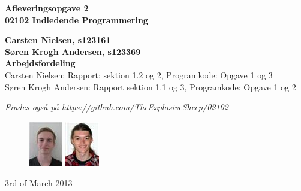 \thispagestyle{empty} %
\hspace{6cm} \vspace{3cm}
\begin{center}
\textbf{\Huge {Afleveringsopgave 2}\\ \vspace{1cm}
\huge{02102 Indledende Programmering}}
\end{center}
\vspace{1cm}
\begin{center}
\Large{\textbf{Carsten Nielsen, s123161 \\ Søren Krogh Andersen, s123369}} \\
\vspace{1cm}
\Large{\textbf{Arbejdsfordeling}} \\
Carsten Nielsen: Rapport: sektion 1.2 og 2, Programkode: Opgave 1 og 3 \\
Søren Krogh Andersen: Rapport sektion 1.1 og 3, Programkode: Opgave 1 og 2

\emph{Findes også på \url{https://github.com/TheExplosiveSheep/02102}}
\end{center}
\vspace{6cm}
\begin{figure}[h]
\hfill
\includegraphics{s123161.png}%
\includegraphics{s123369.png}%
\end{figure}
3rd of March 2013

\thispagestyle{empty}
